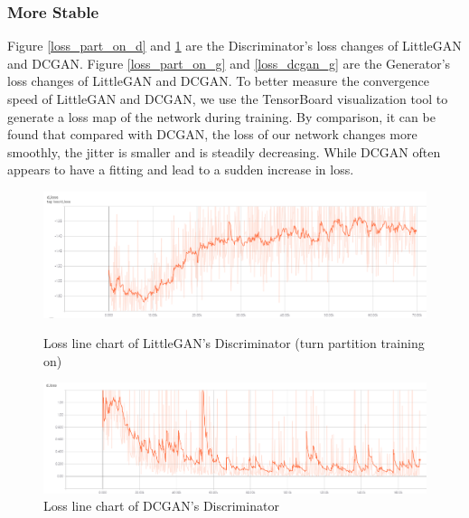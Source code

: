 \subsubsection*{More Stable}
Figure \ref{loss_part_on_d} and \ref{loss_dcgan_d} are the Discriminator's loss changes of LittleGAN and DCGAN.
Figure \ref{loss_part_on_g} and \ref{loss_dcgan_g} are the Generator's loss changes of LittleGAN and DCGAN.
To better measure the convergence speed of LittleGAN and DCGAN, we use the TensorBoard visualization tool to generate a loss map of the network during training.
By comparison, it can be found that compared with DCGAN, the loss of our network changes more smoothly, the jitter is smaller and is steadily decreasing.
While DCGAN often appears to have a fitting and lead to a sudden increase in loss.

\begin{figure}
    \begin{minipage}[t]{0.49\linewidth}
        \centering
        \includegraphics[width=\textwidth]{figures/loss_part_on_d.png}
        \caption{Loss line chart of LittleGAN's Discriminator (turn partition training on)}
        \label{loss_part_on_d}
    \end{minipage}
        \hfill
    \begin{minipage}[t]{0.49\linewidth}
        \centering
        \includegraphics[width=\textwidth]{figures/loss_dcgan_d.png}
        \caption{Loss line chart of DCGAN's Discriminator}
        \label{loss_dcgan_d}
    \end{minipage}
\end{figure}

